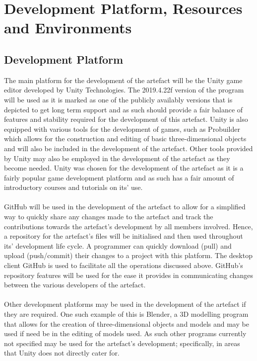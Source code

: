 \section{Development Platform, Resources and Environments}
\subsection{Development Platform}
The main platform for the development of the artefact will be the Unity game editor developed by Unity Technologies. The 2019.4.22f version of the program will be used as it is marked as one of the publicly availably versions that is depicted to get long term support and as such should provide a fair balance of features and stability required for the development of this artefact. Unity is also equipped with various tools for the development of games, such as Probuilder which allows for the construction and editing of basic three-dimensional objects and will also be included in the development of the artefact. Other tools provided by Unity may also be employed in the development of the artefact as they become needed. Unity was chosen for the development of the artefact as it is a fairly popular game development platform and as such has a fair amount of introductory courses and tutorials on its’ use. 
\\\\
GitHub will be used in the development of the artefact to allow for a simplified way to quickly share any changes made to the artefact and track the contributions towards the artefact's development by all members involved. Hence, a repository for the artefact's files will be initialised and then used throughout its’ development life cycle. A programmer can quickly download (pull) and upload (push/commit) their changes to a project with this platform. The desktop client GitHub is used to facilitate all the operations discussed above. GitHub’s repository features will be used for the ease it provides in communicating changes between the various developers of the artefact. 
\\\\
Other development platforms may be used in the development of the artefact if they are required. One such example of this is Blender, a 3D modelling program that allows for the creation of three-dimensional objects and models and may be used if need be in the editing of models used. As such other programs currently not specified may be used for the artefact's development; specifically, in areas that Unity does not directly cater for.


